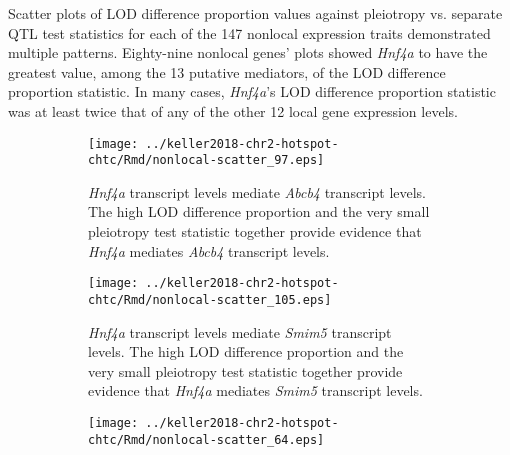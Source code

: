 \documentclass[oneside]{book}
\begin{document}

Scatter plots of LOD difference proportion values against pleiotropy vs. separate QTL test statistics for each of the 147 nonlocal expression traits demonstrated multiple patterns. Eighty-nine nonlocal genes' plots showed \emph{Hnf4a} to have the greatest value, among the 13 putative mediators, of the LOD difference proportion statistic. In many cases, \emph{Hnf4a}'s LOD difference proportion statistic was at least twice that of any of the other 12 local gene expression levels.

\begin{figure}
    \centering
    \caption{Scatter plots for four nonlocal expression traits. Each plot features 13 points, one for each local gene expression trait. The vertical axis denotes LOD difference proportion values, while the horizontal axis corresponds to pleiotropy test statistics. Blue points represent the pairing with local gene expression trait \emph{Hnf4a}. Red points represent the other 12 local gene expression traits.}
    \begin{subfigure}[t]{.45\textwidth}
        \texttt{[image: ../keller2018-chr2-hotspot-chtc/Rmd/nonlocal-scatter\_97.eps]}
        \caption[\emph{Hnf4a} transcript levels mediate \emph{Abcb4} transcript levels.]{\emph{Hnf4a} transcript levels mediate \emph{Abcb4} transcript levels. The high LOD difference proportion and the very small pleiotropy test statistic together provide evidence that \emph{Hnf4a} mediates \emph{Abcb4} transcript levels.}
    \end{subfigure}\hspace{0.05\textwidth}
    \begin{subfigure}[t]{.45\textwidth}
        \texttt{[image: ../keller2018-chr2-hotspot-chtc/Rmd/nonlocal-scatter\_105.eps]}
        \caption[\emph{Hnf4a} transcript levels mediate \emph{Smim5} transcript levels.]{\emph{Hnf4a} transcript levels mediate \emph{Smim5} transcript levels. The high LOD difference proportion and the very small pleiotropy test statistic together provide evidence that \emph{Hnf4a} mediates \emph{Smim5} transcript levels.}
    \end{subfigure}
    \begin{subfigure}[t]{.45\textwidth}
        \texttt{[image: ../keller2018-chr2-hotspot-chtc/Rmd/nonlocal-scatter\_64.eps]}

\end{subfigure}
\end{figure}
\end{document}
